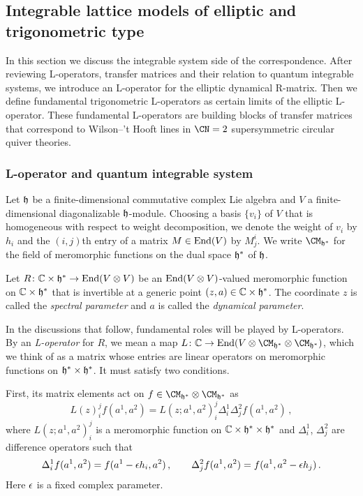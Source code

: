 \subsection{Integrable lattice models of elliptic and trigonometric type}
\label{sec:QIS}

In this section we discuss the integrable system side of the
correspondence.  After reviewing L-operators, transfer matrices and
their relation to quantum integrable systems, we introduce an
L-operator for the elliptic dynamical R-matrix.  Then we define
fundamental trigonometric L-operators as certain limits of the
elliptic L-operator.  These fundamental L-operators are building
blocks of transfer matrices that correspond to Wilson--'t Hooft lines
in $\CN = 2$ supersymmetric circular quiver theories.


\subsubsection{L-operator and quantum integrable system}

Let $\mathfrak{h}$ be a finite-dimensional commutative complex Lie algebra and
$V$ a finite-dimensional diagonalizable $\mathfrak{h}$-module.  Choosing a
basis $\{v_i\}$ of $V$ that is homogeneous with respect to weight
decomposition, we denote the weight of $v_i$ by $h_i$ and the
$(i,j)$th entry of a matrix $M \in \mathop{\mathrm{End}}\nolimits(V)$ by $M^i_j$.  We write
$\CM_{\hf^*}$ for the field of meromorphic functions on the dual
space $\mathfrak{h}^*$ of $\mathfrak{h}$.

Let $R\colon \mathbb{C} \times \mathfrak{h}^* \to \mathop{\mathrm{End}}\nolimits(V \otimes V)$ be an
$\mathop{\mathrm{End}}\nolimits(V \otimes V)$-valued meromorphic function on
$\mathbb{C} \times \mathfrak{h}^*$ that is invertible at a generic point
$(z,a) \in \mathbb{C} \times \mathfrak{h}^*$.  The coordinate $z$ is called
the \emph{spectral parameter} and $a$ is called the
\emph{dynamical parameter}.

In the discussions that follow, fundamental roles will be played by
L-operators.  By an \emph{L-operator} for $R$, we mean a map
$L\colon \C \to \End(V \otimes \CM_{\hf^*} \otimes
\CM_{\hf^*})$, which we think of as a matrix whose entries are
linear operators on meromorphic functions on
$\mathfrak{h}^* \times \mathfrak{h}^*$.  It must satisfy two conditions.

First, its matrix elements act on
$f \in \CM_{\hf^*} \otimes \CM_{\hf^*}$ as
\begin{equation}
  L(z)^j_i f(a^1,a^2)
  = L(z;a^1,a^2)^j_i \Delta_i^1 \Delta_j^2 f(a^1,a^2) \,,
\end{equation}
where $L(z;a^1,a^2)^j_i$ is a meromorphic function on
$\mathbb{C} \times \mathfrak{h}^* \times \mathfrak{h}^*$ and $\Delta_i^1$,
$\Delta_j^2$ are difference operators such that
\begin{equation}
  \Delta_i^1 f(a^1,a^2)
  = f(a^1 - \epsilon h_i,a^2) \,,
  \qquad
  \Delta_j^2 f(a^1,a^2)
  = f(a^1, a^2 - \epsilon h_j) \,.
\end{equation}
Here $\epsilon$ is a fixed complex parameter.

